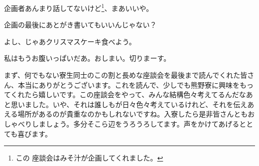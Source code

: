 \begin{multicols}{2}
企画者あんまり話してないけど\footnote{この 座談会はみそ汁が企画してくれました。}、まあいいや。

企画の最後にあとがき書いてもいいんじゃない？

よし、じゃあクリスマスケーキ食べよう。

私はもうお腹いっぱいだあ。おしまい。切りまーす。

\vspace{15mm}
\par まず、何でもない寮生同士のこの割と長めな座談会を最後まで読んでくれた皆さん、本当にありがとうございます。これを読んで、少しでも熊野寮に興味をもってくれたら嬉しいです。この座談会をやって、みんな結構色々考えてるんだなあと思いました。いや、それは誰しもが日々色々考えているけれど、それを伝えあえる場所があるのが貴重なのかもしれないですね。入寮したら是非皆さんともおしゃべりしましょう。多分そこら辺をうろうろしてます。声をかけてあげるととても喜びます。
\end{multicols}